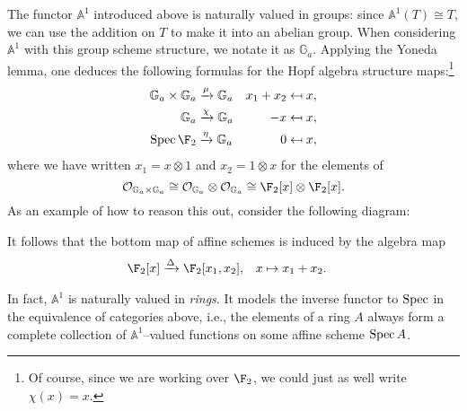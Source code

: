\begin{example}\label{InformalAdditiveGroupExample}
The functor \(\mathbb A^1\) introduced above is naturally valued in groups: since \(\mathbb A^1(T) \cong T\), we can use the addition on \(T\) to make it into an abelian group.  When considering \(\mathbb A^1\) with this group scheme structure, we notate it as \(\mathbb G_a\).  Applying the Yoneda lemma, one deduces the following formulas for the Hopf algebra structure maps:\footnote{Of course, since we are working over \(\F_2\), we could just as well write \(\chi(x) = x\).}
\begin{align*}
\mathbb G_a \times \mathbb G_a & \xrightarrow{\mu} \mathbb G_a & x_1 + x_2 & \mapsfrom x, \\
\mathbb G_a & \xrightarrow{\chi} \mathbb G_a & -x & \mapsfrom x, \\
\Spec \F_2 & \xrightarrow{\eta} \mathbb G_a & 0 & \mapsfrom x,
\end{align*}
where we have written \(x_1 = x \otimes 1\) and \(x_2 = 1 \otimes x\) for the elements of \[\sheaf O_{\mathbb G_a \times \mathbb G_a} \cong \sheaf O_{\mathbb G_a} \otimes \sheaf O_{\mathbb G_a} \cong \F_2[x] \otimes \F_2[x].\]  As an example of how to reason this out, consider the following diagram:
\begin{center}
\end{center}
It follows that the bottom map of affine schemes is induced by the algebra map
\begin{align*}
\F_2[x] & \xrightarrow{\Delta} \F_2[x_1, x_2], &
x & \mapsto x_1 + x_2.
\end{align*}
\end{example}

\begin{remark}
In fact, \(\mathbb A^1\) is naturally valued in \emph{rings}. It models the inverse functor to \(\operatorname{Spec}\) in the equivalence of categories above, i.e., the elements of a ring \(A\) always form a complete collection of \(\mathbb A^1\)--valued functions on some affine scheme \(\operatorname{Spec} A\).
\end{remark}


